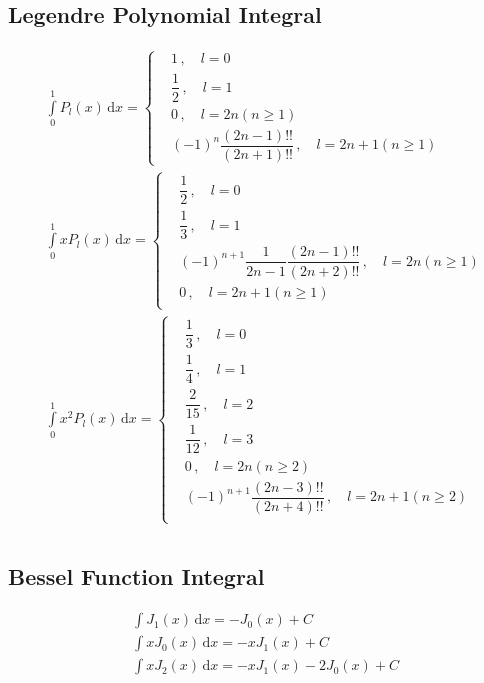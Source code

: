 \documentclass[10pt, a4paper, twocolumn]{article}
\def\d{\,\mathrm{d}}
\begin{document}
	\subsection{Legendre Polynomial Integral}
		\begin{align*}
			&\int \limits^1_0 P_l(x)\d x
			= \left\{\begin{aligned}
				&1\, ,\quad l=0\\
				&\dfrac{1}{2}\, ,\quad l=1\\
				&0\, ,\quad l = 2n (n \geq 1)\\
				&(-1)^n\dfrac{(2n-1)!!}{(2n+1)!!}\, ,\quad l=2n+1 (n \geq 1)
			\end{aligned}\right.\\
			&\int \limits^1_0 xP_l(x)\d x
			= \left\{\begin{aligned}
				&\dfrac{1}{2}\, ,\quad l=0\\
				&\dfrac{1}{3}\, ,\quad l=1\\
				&(-1)^{n+1}\dfrac{1}{2n-1}\dfrac{(2n-1)!!}{(2n+2)!!}\, ,\quad l=2n (n \geq 1)\\
				&0\, ,\quad l = 2n+1 (n \geq 1)\\
			\end{aligned}\right.\\
			&\int \limits^1_0 x^2P_l(x)\d x
			= \left\{\begin{aligned}
				&\dfrac{1}{3}\, ,\quad l=0\\
				&\dfrac{1}{4}\, ,\quad l=1\\
				&\dfrac{2}{15}\, ,\quad l=2\\
				&\dfrac{1}{12}\, ,\quad l=3\\
				&0\, ,\quad l = 2n (n \geq 2)\\
				&(-1)^{n+1}\dfrac{(2n-3)!!}{(2n+4)!!}\, ,\quad l=2n+1 (n \geq 2)\\
			\end{aligned}\right.\\
		\end{align*}
	
	\subsection{Bessel Function Integral}
		\begin{align*}
			&\int J_1(x)\d x = -J_0(x) + C\\
			&\int x J_0(x)\d x = -xJ_1(x) + C\\
			&\int x J_2(x)\d x = -xJ_1(x) - 2 J_0(x) + C 
		\end{align*}
\end{document}
